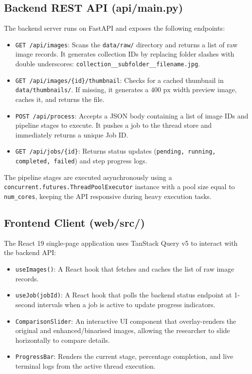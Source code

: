 \subsection{Backend REST API (api/main.py)}
The backend server runs on FastAPI and exposes the following endpoints:
\begin{itemize}
	\item \texttt{GET /api/images}: Scans the \texttt{data/raw/} directory and returns a list of raw image records. It generates collection IDs by replacing folder slashes with double underscores: \texttt{collection\_\_subfolder\_\_filename.jpg}.
	
	\item \texttt{GET /api/images/\{id\}/thumbnail}: Checks for a cached thumbnail in \texttt{data/thumbnails/}. If missing, it generates a $400\text{ px}$ width preview image, caches it, and returns the file.
	
	\item \texttt{POST /api/process}: Accepts a JSON body containing a list of image IDs and pipeline stages to execute. It pushes a job to the thread store and immediately returns a unique Job ID.
	
	\item \texttt{GET /api/jobs/\{id\}}: Returns status updates (\texttt{pending, running, completed, failed}) and step progress logs.
\end{itemize}
The pipeline stages are executed asynchronously using a \texttt{concurrent.futures.ThreadPoolExecutor} instance with a pool size equal to \texttt{num\_cores}, keeping the API responsive during heavy execution tasks.

\subsection{Frontend Client (web/src/)}
The React 19 single-page application uses TanStack Query v5 to interact with the backend API:
\begin{itemize}
	\item \texttt{useImages()}: A React hook that fetches and caches the list of raw image records.
	
	\item \texttt{useJob(jobId)}: A React hook that polls the backend status endpoint at 1-second intervals when a job is active to update progress indicators.
	
	\item \texttt{ComparisonSlider}: An interactive UI component that overlay-renders the original and enhanced/binarised images, allowing the researcher to slide horizontally to compare details.
	
	\item \texttt{ProgressBar}: Renders the current stage, percentage completion, and live terminal logs from the active thread execution.
\end{itemize}

